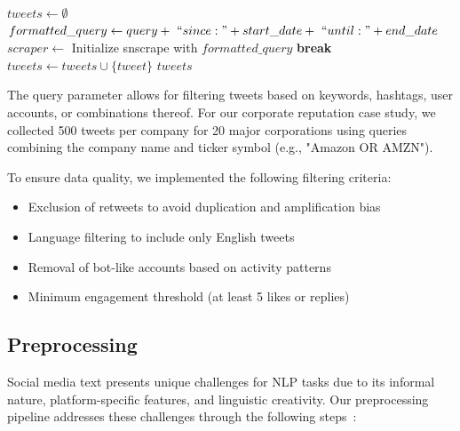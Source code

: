 \documentclass[conference]{IEEEtran}
\begin{document}
\begin{algorithm}
\caption{X (Twitter) Data Collection Process}
\begin{minipage}{0.8\linewidth}
\begin{algorithmic}[1]
    \State $tweets \gets \emptyset$
    \State $formatted\_query \gets query +\ ``since:" + start\_date +\ `` until:" + end\_date$
    \State $scraper \gets$ Initialize snscrape with $formatted\_query$
            \State \textbf{break}
        \EndIf
            \State $tweets \gets tweets \cup \{tweet\}$
        \EndIf
    \EndFor
    \State \Return $tweets$
\EndProcedure
\end{algorithmic}
\end{minipage}
\end{algorithm}

The query parameter allows for filtering tweets based on keywords, hashtags, user accounts, or combinations thereof. For our corporate reputation case study, we collected 500 tweets per company for 20 major corporations using queries combining the company name and ticker symbol (e.g., "Amazon OR AMZN").

To ensure data quality, we implemented the following filtering criteria:
\begin{itemize}
    \item Exclusion of retweets to avoid duplication and amplification bias
    \item Language filtering to include only English tweets
    \item Removal of bot-like accounts based on activity patterns
    \item Minimum engagement threshold (at least 5 likes or replies)
\end{itemize}



\subsection{Preprocessing}
Social media text presents unique challenges for NLP tasks due to its informal nature, platform-specific features, and linguistic creativity. Our preprocessing pipeline addresses these challenges through the following steps~\cite{igi2022preprocessing, churchill2021preprocessing, techtarget2022preprocessing}:
\end{document}

